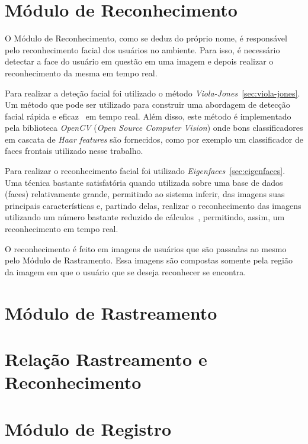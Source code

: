 \section{Módulo de Reconhecimento}

	O Módulo de Reconhecimento, como se deduz do próprio nome, é responsável pelo reconhecimento facial dos usuários no ambiente. Para isso, é necessário detectar a face do usuário em questão em uma imagem e depois realizar o reconhecimento da mesma em tempo real. 

	Para realizar a deteção facial foi utilizado o método \textit{Viola-Jones}~\ref{sec:viola-jones}. Um método que pode ser utilizado para construir uma abordagem de detecção facial rápida e eficaz~\cite{violajones} em tempo real. Além disso, este método é implementado pela biblioteca \textit{OpenCV} (\textit{Open Source Computer Vision}) onde bons classificadores em cascata de \textit{Haar features} são fornecidos, como por exemplo um classificador de faces frontais utilizado nesse trabalho.

	Para realizar o reconhecimento facial foi utilizado \textit{Eigenfaces}~\ref{sec:eigenfaces}. Uma técnica bastante satisfatória quando utilizada sobre uma base de dados (faces) relativamente grande, permitindo ao sistema inferir, das imagens suas principais características e, partindo delas, realizar o reconhecimento das imagens utilizando um número bastante reduzido de cálculos~\cite{artigo-eigenface}, permitindo, assim, um reconhecimento em tempo real.

	O reconhecimento é feito em imagens de usuários que são passadas ao mesmo pelo Módulo de Rastramento. Essa imagens são compostas somente pela região da imagem em que o usuário que se deseja reconhecer se encontra.

\section{Módulo de Rastreamento}

\section{Relação Rastreamento e Reconhecimento}

\section{Módulo de Registro}

